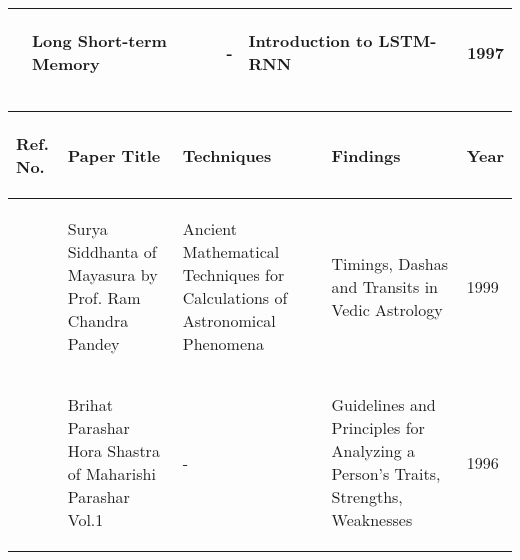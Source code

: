 \begin{tabularx}{\columnwidth}{|X|X|X|X|X|}
	\hline
	\begin{center}\cite{article}\end{center} & \begin{center}Long Short-term Memory\end{center} & \begin{center}-\end{center} & \begin{center}Introduction to LSTM-RNN\end{center} & \begin{center}1997\end{center}\\
	\hline
\end{tabularx}

\begin{tabularx}{\columnwidth}{|X|X|X|X|X|}
	\hline
	\begin{center}\textbf{Ref. No.}\end{center} & \begin{center}\textbf{Paper Title}\end{center} & \begin{center}\textbf{Techniques}\end{center} & \begin{center}\textbf{Findings}\end{center} & \begin{center}\textbf{Year}\end{center}\\
	\hline
	\begin{center}\cite{SuryaSiddhanta}\end{center} & \begin{center}Surya Siddhanta of Mayasura by Prof. Ram Chandra Pandey\end{center} & \begin{center}Ancient Mathematical Techniques for Calculations of Astronomical Phenomena\end{center} & \begin{center}Timings, Dashas and Transits in Vedic Astrology\end{center} & \begin{center}1999\end{center}\\
	\hline
	\begin{center}\cite{BrihatParasharHoraShastraVol1}\end{center} & \begin{center}Brihat Parashar Hora Shastra of Maharishi Parashar Vol.1\end{center} & \begin{center}-\end{center} & \begin{center}Guidelines and Principles for Analyzing a Person's Traits, Strengths, Weaknesses\end{center} & \begin{center}1996\end{center}\\

\end{tabularx}
